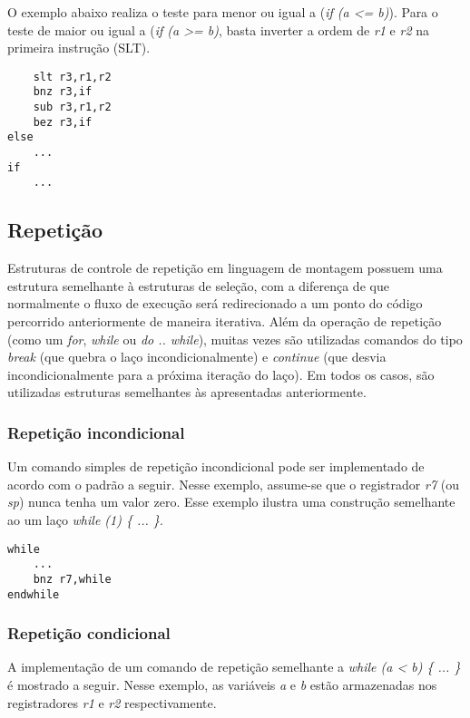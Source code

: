 \documentclass{extreport}
\begin{document}
O exemplo abaixo realiza o teste para menor ou igual a (\textit{if (a <= b)}). Para o teste de maior ou igual a (\textit{if (a >= b)}, basta inverter a ordem de \textit{r1} e \textit{r2} na primeira instrução (SLT).

\begin{verbatim}
    slt r3,r1,r2
    bnz r3,if
    sub r3,r1,r2
    bez r3,if
else
    ...
if
    ...
\end{verbatim}

\subsection{Repetição}

Estruturas de controle de repetição em linguagem de montagem possuem uma estrutura semelhante à estruturas de seleção, com a diferença de que normalmente o fluxo de execução será redirecionado a um ponto do código percorrido anteriormente de maneira iterativa. Além da operação de repetição (como um \textit{for}, \textit{while} ou \textit{do .. while}), muitas vezes são utilizadas comandos do tipo \textit{break} (que quebra o laço incondicionalmente) e \textit{continue} (que desvia incondicionalmente para a próxima iteração do laço). Em todos os casos, são utilizadas estruturas semelhantes às apresentadas anteriormente.

\subsubsection{Repetição incondicional}

Um comando simples de repetição incondicional pode ser implementado de acordo com o padrão a seguir. Nesse exemplo, assume-se que o registrador \textit{r7} (ou \textit{sp}) nunca tenha um valor zero. Esse exemplo ilustra uma construção semelhante ao um laço \textit{while (1) \{ ... \}}.

\begin{verbatim}
while
    ...
    bnz r7,while
endwhile
\end{verbatim}

\subsubsection{Repetição condicional}

A implementação de um comando de repetição semelhante a \textit{while (a < b) \{ ... \}} é mostrado a seguir. Nesse exemplo, as variáveis \textit{a} e \textit{b} estão armazenadas nos registradores \textit{r1} e \textit{r2} respectivamente.
\end{document}
